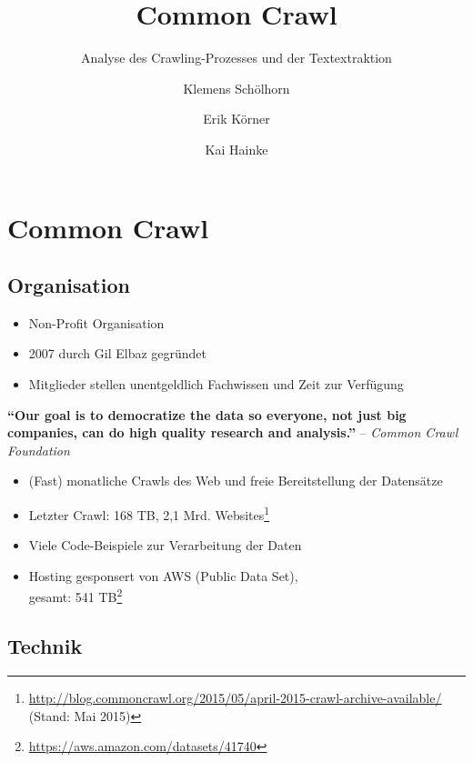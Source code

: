 \documentclass[a4paper,12pt,titlepage=false]{scrreprt}
\title{\vspace{3cm}Common Crawl}
\subtitle{Analyse des Crawling-Prozesses und der Textextraktion}
\author{Klemens Schölhorn \and Erik Körner \and Kai Hainke}
\begin{document}
\maketitle
\vspace{2cm}
\tableofcontents

\onehalfspacing

\chapter{Common Crawl}

\section{Organisation}

\begin{itemize}
    \item Non-Profit Organisation
    \item 2007 durch Gil Elbaz gegründet
    \item Mitglieder stellen unentgeldlich Fachwissen und Zeit zur Verfügung
\end{itemize}
\textbf{``Our goal is to democratize the data so everyone, not just big companies, can do high quality research and analysis.''}
\hfill-- \textit{Common Crawl Foundation}

\begin{itemize}
    \item (Fast) monatliche Crawls des Web und freie Bereitstellung der Datensätze
    \item Letzter Crawl: 168 TB, 2,1 Mrd. Websites\footnote{\url{http://blog.commoncrawl.org/2015/05/april-2015-crawl-archive-available/} (Stand: Mai 2015)}
    \item Viele Code-Beispiele zur Verarbeitung der Daten
    \item Hosting gesponsert von AWS (Public Data Set),\\gesamt: 541 TB\footnote{\url{https://aws.amazon.com/datasets/41740}}
\end{itemize}


\section{Technik}
\end{document}
